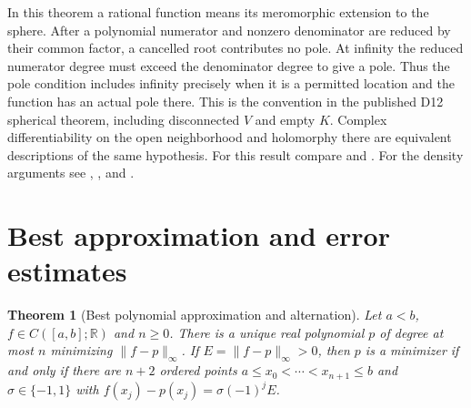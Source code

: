 \documentclass[11pt,oneside,openany]{book}
\newtheorem{theorem}{Theorem}[chapter]
\theoremstyle{definition}
\theoremstyle{remark}
\begin{document}
In this theorem a rational function means its meromorphic extension
to the sphere. After a polynomial numerator and nonzero denominator
are reduced by their common factor, a cancelled root contributes
no pole. At infinity the reduced numerator degree must exceed the
denominator degree to give a pole. Thus the pole condition includes
infinity precisely when it is a permitted location and the function
has an actual pole there. This is the convention in the published
D12 spherical theorem, including disconnected $V$ and empty $K$.
Complex differentiability on the open neighborhood and holomorphy
there are equivalent descriptions of the same hypothesis. For this
result compare \cite[Chapter~VIII, Section~1, Theorem~1.7]{conway}
and \cite[Chapter~15]{d12}. For the density arguments see
\cite[Section~4.7, Theorems~4.45 and 4.51]{folland},
\cite[Sections~11.14--11.15]{apostol}, and
\cite[Chapters~1 and 10]{devore-lorentz}.

\section{Best approximation and error estimates}

\begin{theorem}[Best polynomial approximation and alternation]
\label{p102:U1-06}
Let $a<b$, $f\in C([a,b];\mathbb R)$ and $n\ge0$. There is a unique
real polynomial $p$ of degree at most $n$ minimizing
$\|f-p\|_\infty$. If $E=\|f-p\|_\infty>0$, then $p$ is a minimizer
if and only if there are $n+2$ ordered points
$a\le x_0<\cdots<x_{n+1}\le b$ and $\sigma\in\{-1,1\}$ with
$f(x_j)-p(x_j)=\sigma(-1)^j E$.
\end{theorem}
\end{document}
